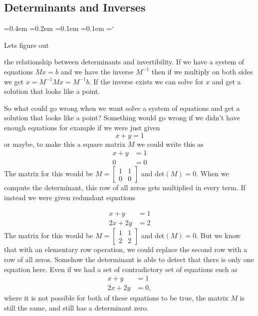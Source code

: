 
\subsection*{Determinants and Inverses}

{\ttfamily
{}\font=0.4em
\font=0.2em
\font=0.1em
\font=0.1em
\hyphenchar\font=`\-


\hypertarget{scripts_elementary_matrices_determinants_ii_inverses}{Lets figure out} the relationship between determinants and invertibility. If we have a system of equations $Mx=b$ and we have the inverse $M^{-1}$ then if we multiply on both sides we get $ x = M^{-1}Mx= M^{-1}b$. If the inverse exists we can solve for $x$ and get a solution that looks like a point. 

So what could go wrong when we want solve a system of equations and get a solution that looks like a point? Something would go wrong if we didn't have enough equations for example if we were just given 
\[
x+y = 1
\]
or maybe, to make this a square matrix $M$ we could write this as 
\begin{align*}
x+y &= 1\\
0 &= 0
\end{align*}
The matrix for this would be 
$M =\begin{bmatrix}
1 & 1\\
0& 0 
\end{bmatrix}$ 
and det$(M) = 0$. When we compute the determinant, this row of all zeros gets multiplied in every term. If instead we were given redundant equations 

\begin{align*}
x+y &= 1\\
2x+2y &= 2
\end{align*}
The matrix for this would be 
$M =\begin{bmatrix}
1 & 1\\
2& 2 
\end{bmatrix}$  and det$(M) = 0$. But we know that with an elementary row operation, we could replace the second row with a row of all zeros. Somehow the determinant is able to detect that there is only one equation here. Even if we had a set of contradictory set of equations such as
\begin{align*}
x+y &= 1\\
2x+2y &= 0,
\end{align*}
where it is not possible for both of these equations to be true, the matrix $M$ is still the same, and still has a determinant zero.

}
